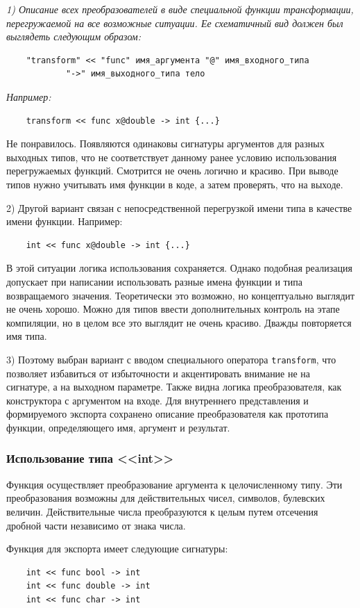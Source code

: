 \textit{1) Описание всех преобразователей в виде специальной функции трансформации, перегружаемой на все возможные ситуации. Ее схематичный вид должен был выглядеть следующим образом:}
\begin{verbatim}
    "transform" << "func" имя_аргумента "@" имя_входного_типа
            "->" имя_выходного_типа тело
\end{verbatim}
\textit{Например:}
\begin{verbatim}
    transform << func x@double -> int {...}
\end{verbatim}
Не понравилось. Появляются одинаковы сигнатуры аргументов для разных выходных типов, что не соответствует данному ранее условию использования перегружаемых функций. Смотрится не очень логично и красиво. При выводе типов нужно учитывать имя функции в коде, а затем проверять, что на выходе.

2) Другой вариант связан с непосредственной перегрузкой имени типа в качестве имени функции. Например:
\begin{verbatim}
    int << func x@double -> int {...}
\end{verbatim}
В этой ситуации логика использования сохраняется. Однако подобная реализация допускает при написании использовать разные имена функции и типа возвращаемого значения. Теоретически это возможно, но концептуально выглядит не очень хорошо. Можно для типов ввести дополнительных контроль на этапе компиляции, но в целом все это выглядит не очень красиво. Дважды повторяется имя типа.

3) Поэтому выбран вариант с вводом специального оператора \verb|transform|, что позволяет избавиться от избыточности и акцентировать внимание не на сигнатуре, а на выходном параметре. Также видна логика преобразователя, как конструктора с аргументом на входе. Для внутреннего представления и формируемого экспорта сохранено описание преобразователя как прототипа функции, определяющего имя, аргумент и результат.

\subsubsection{Использование типа <<int>>}

Функция осуществляет преобразование аргумента к целочисленному типу. Эти преобразования возможны для действительных чисел, символов, булевских величин. Действительные числа преобразуются к целым путем отсечения дробной части независимо от знака числа.

Функция для экспорта имеет следующие сигнатуры:
\begin{verbatim}
    int << func bool -> int
    int << func double -> int
    int << func char -> int
\end{verbatim}

